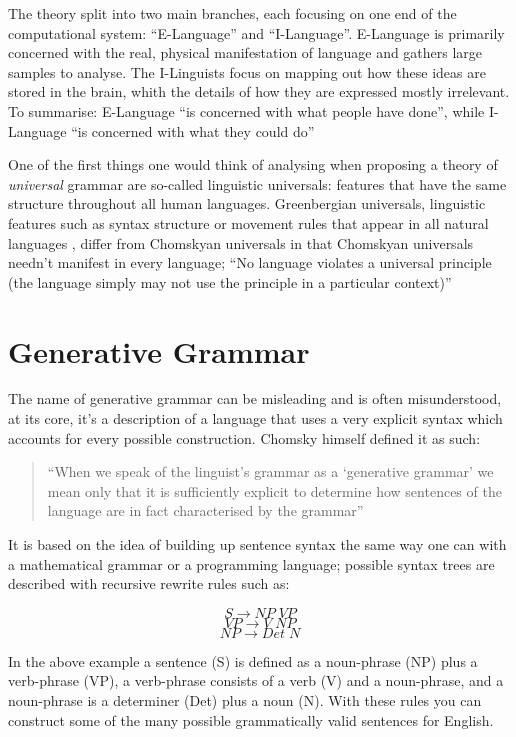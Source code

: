 \documentclass[a4paper,10pt]{article}
\newcommand{\mli}[1]{\mathit{#1}}
\begin{document}
The theory split into two main branches, each focusing on one end of the computational system:
``E-Language'' and ``I-Language''. E-Language is primarily concerned with
the real, physical manifestation of language and gathers large samples to analyse. The
I-Linguists focus on mapping out how these ideas are stored in the brain, whith the details of
how they are expressed mostly irrelevant. To summarise: E-Language ``is concerned with what people
have done'', while I-Language ``is concerned with what they could do'' \citep[p.~14]{ChUGAI}

One of the first things one would think of analysing when proposing a theory of \emph{universal} grammar
are so-called linguistic universals: features that have the same structure throughout all human
languages. Greenbergian universals, linguistic features such as syntax structure or movement rules
that appear in all natural languages \citep{Greenberg473}, differ from Chomskyan universals in that
Chomskyan universals needn't manifest in every language; ``No language violates a universal principle
(the language simply may not use the principle in a particular context)'' \citep[p.~23]{ChUGAI}


\section{Generative Grammar}
The name of generative grammar can be misleading and is often misunderstood,
at its core, it's a description of a language that uses a very explicit syntax which accounts
for every possible construction. Chomsky himself defined it as such:

\begin{quote}
	``When we speak of the linguist's grammar as a `generative grammar' we mean only that it is
	sufficiently explicit to determine how sentences of the language are in fact characterised
	by the grammar''
	
	\citet[p.~220]{Chomsky80}
\end{quote}

It is based on the idea of building up sentence syntax the same way one can with
a mathematical grammar or a programming language; possible syntax trees are described with recursive
rewrite rules such as:

\[        S \rightarrow \mli{NP} \; \mli{VP} \]
\[ \mli{VP} \rightarrow V        \; \mli{NP} \]
\[ \mli{NP} \rightarrow Det      \; N        \]

In the above example a sentence (S) is defined as a noun-phrase (NP) plus a verb-phrase (VP),
a verb-phrase consists of a verb (V) and a noun-phrase, and a noun-phrase is a determiner (Det) plus
a noun (N). With these rules you can construct some of the many possible grammatically valid sentences
for English. \citep[p.~32]{ChUGAI}
\end{document}
